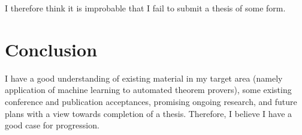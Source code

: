 \documentclass[a4paper, 10pt]{article}
\begin{document}
I therefore think it is improbable that I fail to submit a thesis of some form.

\section{Conclusion}
I have a good understanding of existing material in my target area (namely application of machine learning to automated theorem provers), some existing conference and publication acceptances, promising ongoing research, and future plans with a view towards completion of a thesis.
Therefore, I believe I have a good case for progression.


\printbibliography
\end{document}
